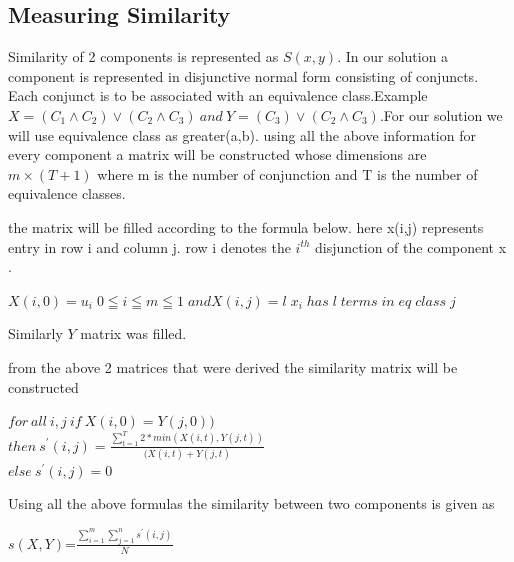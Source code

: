 \documentclass[12pt]{article}
\begin{document}
\subsection{Measuring Similarity}
Similarity of 2 components is represented as \(S(x,y)\).
In our solution a component is represented in disjunctive normal form consisting of conjuncts. Each conjunct is to be associated with an equivalence class.Example \(X=(C_1 \wedge C_2)\vee(C_2 \wedge C_3)\ and \ Y=(C_3)\vee(C_2 \wedge C_3)\).For our solution we will use equivalence class as greater(a,b).
using all the above information for every component a matrix will be constructed whose dimensions are \(m \times (T+1)\) where m is the number of conjunction and T is the number of equivalence classes.

the matrix will be filled according to the formula below.
here x(i,j) represents entry in row i and column j.
row i denotes the $i^{th}$ disjunction of the component x .
\begin{center}
	\(X(i,0) = u_i\;  0 \leqq i \leqq m \leqq 1\;and 
	X(i,j) = l\;  x_i\;has\;l\;terms\;in\;eq\;class\;j
	\)
\end{center}

Similarly \(Y\) matrix was filled.


from the above 2 matrices that were derived the similarity matrix will be constructed 
\begin{center}
	\(
	for\ all\ i,j\ if\ X(i,0)=Y(j,0)
	)\
	\)
	\\
	\(
	then\ s^{'} (i,j)=\frac{\sum_{t=1}^{T}2*min(X(i,t),Y(j,t))}{(X(i,t)+Y(j,t)}\)
	\\
	\(else\ s^{'}(i,j)=0
	\)
\end{center}

Using all the above formulas the similarity between two components is given as 
\begin{center}
	\(s(X,Y)\)=$\frac{\sum_{i=1}^{m}\sum_{j=1}^{n}s^{'}(i,j)}{N}$
\end{center}
\end{document}
